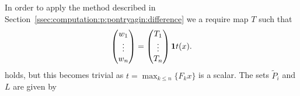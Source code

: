 \documentclass[final]{elsarticle}
\providecommand{\conv}{\text{conv}}
\theoremstyle{remark}
\theoremstyle{definition}
\begin{document}
In order to apply the method described in Section~\ref{ssec:computation:p:pontryagin:difference} we a require map $T$ such that 
%
$$
\begin{pmatrix}
w_1\\ \vdots \\ w_n
\end{pmatrix} = \begin{pmatrix}T_1\\\vdots\\T_n\end{pmatrix}{\bf{1}}t(x).
$$
%
holds, but this becomes trivial as $t=\max_{k\leq n} \{F_kx\}$ is a scalar.
% 
The sets $\tilde P_i$ and $L$ are given by
%
\end{document}
